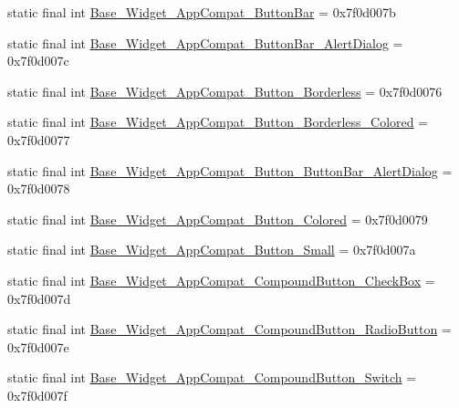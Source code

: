 \begin{DoxyCompactItemize}
\item 
static final int \mbox{\hyperlink{classandroid_1_1support_1_1design_1_1_r_1_1style_ae2f98036d7d39887e218051130a6451b}{Base\+\_\+\+Widget\+\_\+\+App\+Compat\+\_\+\+Button\+Bar}} = 0x7f0d007b
\item 
static final int \mbox{\hyperlink{classandroid_1_1support_1_1design_1_1_r_1_1style_a683c70b9226720a79c12a2be03fb2858}{Base\+\_\+\+Widget\+\_\+\+App\+Compat\+\_\+\+Button\+Bar\+\_\+\+Alert\+Dialog}} = 0x7f0d007c
\item 
static final int \mbox{\hyperlink{classandroid_1_1support_1_1design_1_1_r_1_1style_aa9a41e0b3b102853a8a329a7fe7e322a}{Base\+\_\+\+Widget\+\_\+\+App\+Compat\+\_\+\+Button\+\_\+\+Borderless}} = 0x7f0d0076
\item 
static final int \mbox{\hyperlink{classandroid_1_1support_1_1design_1_1_r_1_1style_a492ab5e68241a223be03eb05c7c0a394}{Base\+\_\+\+Widget\+\_\+\+App\+Compat\+\_\+\+Button\+\_\+\+Borderless\+\_\+\+Colored}} = 0x7f0d0077
\item 
static final int \mbox{\hyperlink{classandroid_1_1support_1_1design_1_1_r_1_1style_a741cde0e312b8362ca9dfc60e04349c9}{Base\+\_\+\+Widget\+\_\+\+App\+Compat\+\_\+\+Button\+\_\+\+Button\+Bar\+\_\+\+Alert\+Dialog}} = 0x7f0d0078
\item 
static final int \mbox{\hyperlink{classandroid_1_1support_1_1design_1_1_r_1_1style_ad08fe86bdef40d5490165e9498049f1e}{Base\+\_\+\+Widget\+\_\+\+App\+Compat\+\_\+\+Button\+\_\+\+Colored}} = 0x7f0d0079
\item 
static final int \mbox{\hyperlink{classandroid_1_1support_1_1design_1_1_r_1_1style_af4fe17666ae12ade0cc5dccc4e73d81c}{Base\+\_\+\+Widget\+\_\+\+App\+Compat\+\_\+\+Button\+\_\+\+Small}} = 0x7f0d007a
\item 
static final int \mbox{\hyperlink{classandroid_1_1support_1_1design_1_1_r_1_1style_a5a7e703fc8df208a54098fb7c9b33df3}{Base\+\_\+\+Widget\+\_\+\+App\+Compat\+\_\+\+Compound\+Button\+\_\+\+Check\+Box}} = 0x7f0d007d
\item 
static final int \mbox{\hyperlink{classandroid_1_1support_1_1design_1_1_r_1_1style_ab596edf2643e391425f1a469e69ce390}{Base\+\_\+\+Widget\+\_\+\+App\+Compat\+\_\+\+Compound\+Button\+\_\+\+Radio\+Button}} = 0x7f0d007e
\item 
static final int \mbox{\hyperlink{classandroid_1_1support_1_1design_1_1_r_1_1style_ad527149587e3b47f9834113f439d22c2}{Base\+\_\+\+Widget\+\_\+\+App\+Compat\+\_\+\+Compound\+Button\+\_\+\+Switch}} = 0x7f0d007f
\item 

\end{DoxyCompactItemize}
